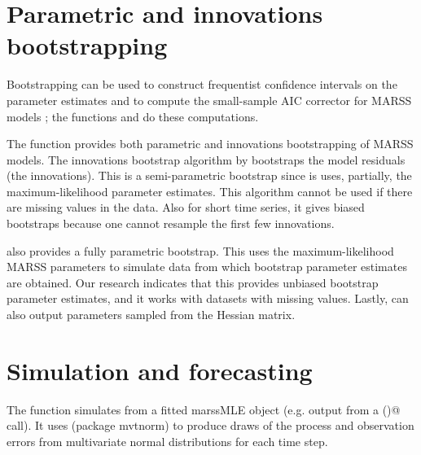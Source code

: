 \section{Parametric and innovations bootstrapping}
Bootstrapping can be used to construct frequentist confidence intervals on the parameter estimates \citep{StofferWall1991} and to compute the small-sample AIC corrector for MARSS models \citep{CavanaughShumway1997}; the functions \verb@MARSSparamCIs@{} and \verb@MARSSaic@{} do these computations. 

The \verb@MARSSboot@{} function provides both parametric and innovations bootstrapping of MARSS models.  
The innovations bootstrap algorithm by \citet{StofferWall1991}  bootstraps the model residuals (the innovations).  This is a semi-parametric bootstrap since is uses, partially, the maximum-likelihood parameter estimates.  This algorithm cannot be used if there are missing values in the data.  Also for short time series, it gives biased bootstraps because one cannot resample the first few innovations.  

\verb@MARSSboot@ also provides a fully parametric bootstrap.  This uses the maximum-likelihood MARSS parameters to simulate data from which bootstrap parameter estimates are obtained.  Our research \citep{HolmesWard2010} indicates that this provides unbiased bootstrap parameter estimates, and it works with datasets with missing values.  Lastly, \verb@MARSSboot@ can also output parameters sampled from the Hessian matrix.  

\section{Simulation and forecasting}
The \verb@MARSSsimulate@{} function simulates from a fitted marssMLE object (e.g. output from a \verb@MARSS()@ call).  It uses \verb@rmvnorm@ (package mvtnorm) to produce draws of the process and observation errors from multivariate normal distributions for each time step.  

